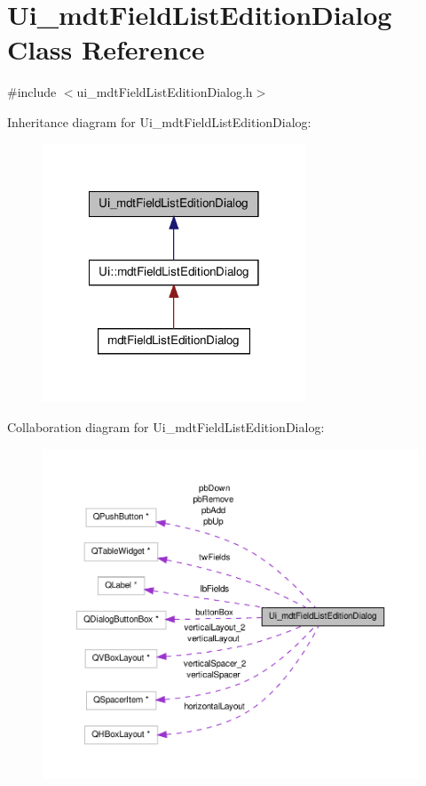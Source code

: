 \hypertarget{class_ui__mdt_field_list_edition_dialog}{\section{Ui\-\_\-mdt\-Field\-List\-Edition\-Dialog Class Reference}
\label{class_ui__mdt_field_list_edition_dialog}
}


{\ttfamily \#include $<$ui\-\_\-mdt\-Field\-List\-Edition\-Dialog.\-h$>$}



Inheritance diagram for Ui\-\_\-mdt\-Field\-List\-Edition\-Dialog\-:
\nopagebreak
\begin{figure}[H]
\begin{center}
\leavevmode
\includegraphics[width=222pt]{class_ui__mdt_field_list_edition_dialog__inherit__graph}
\end{center}
\end{figure}


Collaboration diagram for Ui\-\_\-mdt\-Field\-List\-Edition\-Dialog\-:
\nopagebreak
\begin{figure}[H]
\begin{center}
\leavevmode
\includegraphics[width=350pt]{class_ui__mdt_field_list_edition_dialog__coll__graph}
\end{center}
\end{figure}
